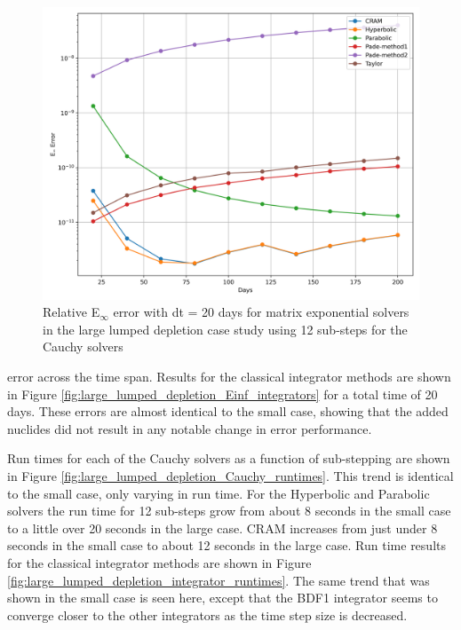 \begin{figure}[p]
    \centering
    \includegraphics[width=5in]{images/chapter-5/caseStudies/largeLumpedDepletion/msrlargeLumpDepletionEinfErrorerrorSteps12.png}
    \caption{Relative E$_{\infty}$ error with dt = 20 days for matrix exponential solvers in the large lumped depletion case study using 12 sub-steps for the Cauchy solvers}
    \label{fig:large_lumped_depletion_Einf_steps12}
\end{figure}

\clearpage


\noindent error across the time span. Results for the classical integrator methods are shown in Figure \ref{fig:large_lumped_depletion_Einf_integrators} for a total time of 20 days. These errors are almost identical to the small case, showing that the added nuclides did not result in any notable change in error performance. 

Run times for each of the Cauchy solvers as a function of sub-stepping are shown in Figure \ref{fig:large_lumped_depletion_Cauchy_runtimes}. This trend is identical to the small case, only varying in run time. For the Hyperbolic and Parabolic solvers the run time for 12 sub-steps grow from about 8 seconds in the small case to a little over 20 seconds in the large case. CRAM increases from just under 8 seconds in the small case to about 12 seconds in the large case. Run time results for the classical integrator methods are shown in Figure \ref{fig:large_lumped_depletion_integrator_runtimes}. The same trend that was shown in the small case is seen here, except that the BDF1 integrator seems to converge closer to the other integrators as the time step size is decreased. 

